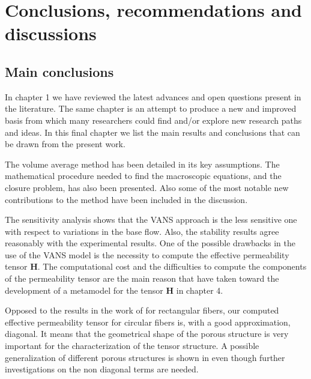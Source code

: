 \chapter{Conclusions, recommendations and discussions}



\section{Main conclusions}

In chapter 1 we have reviewed the latest advances and open questions present in the literature. The same chapter is an attempt to produce a new and improved basis from which many researchers could find and/or explore new research paths and ideas. In this final chapter we list the main results and conclusions that can be drawn from the present work.


The volume average method has been detailed in its key assumptions. The mathematical procedure needed to find the macroscopic equations, and the closure problem, has also been presented. Also some of the most notable new contributions to the method have been included in the discussion. %

 The sensitivity analysis shows that the VANS approach is the less sensitive one with respect to variations in the base flow. Also, the stability results agree reasonably with the experimental results. One of the possible drawbacks in the use of the VANS model is the necessity to compute the effective permeability tensor $\mathbf{H}$. %
The computational cost and the difficulties to compute the components of the permeability tensor are the main reason that have taken toward the development of a metamodel for the tensor $\mathbf{H}$ in chapter 4.
 
Opposed to the results in the work of \citet{lasseux} for rectangular fibers, our computed effective permeability tensor for circular fibers is, with a good approximation, diagonal. It means that the geometrical shape of the porous structure is very important for the characterization of the tensor structure. A possible generalization of different porous structures is shown in \citet{pauthenet} even though further investigations on the non diagonal terms are needed.


